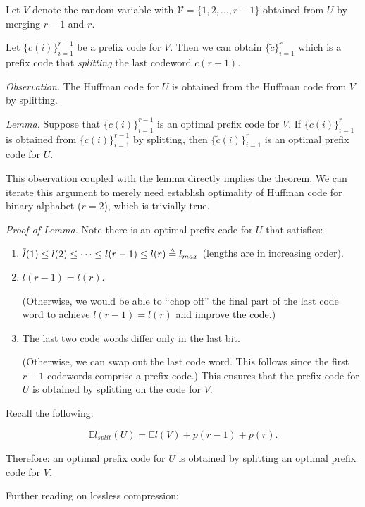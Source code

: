 \documentclass[12pt]{extarticle}
\newcommand{\EE}{\mathbb{E}}
\def\VV{\mathcal{V}}
\begin{document}
\def\VV{\mathcal{V}}

Let $V$ denote the random variable with $\VV = \{1, 2, \dots, r-1 \}$ obtained from $U$ by merging $r-1$ and $r$.

\def\ct{\tilde{c}}

Let $\{ c(i) \}_{i=1}^{r-1}$ be a prefix code for $V$.  Then we can obtain $\{\ct\}_{i=1}^{r}$ which is a prefix code that \textit{splitting} the last codeword $c(r-1)$.  

{\it Observation.} The Huffman code for $U$ is obtained from the Huffman code from $V$ by splitting.

{\it Lemma.} Suppose that $\{ c(i) \}_{i=1}^{r-1}$ is an optimal prefix code for $V$.  If $\{ \ct(i) \}_{i=1}^{r}$ is obtained from $\{ c(i) \}_{i=1}^{r-1}$ by splitting, then $\{ \ct(i) \}_{i=1}^{r}$ is an optimal prefix code for $U$.

This observation coupled with the lemma directly implies the theorem.  We can iterate this argument to merely need establish optimality of Huffman code for binary alphabet ($r=2$), which is trivially true.

\def\ep{\hfill \blacksquare}
\def\dq{\triangleq}
{\it Proof of Lemma.}  Note there is an optimal prefix code for $U$ that satisfies:

\def\lt{\tidle{l}}
\begin{enumerate}
  \item $\l(1) \leq l(2) \leq \dots \leq l(r-1) \leq l(r) \dq l_{max}$ (lengths are in increasing order).
  \item $l(r-1) = l(r)$.  
    
    (Otherwise, we would be able to ``chop off'' the final part of the last code word to achieve $l(r-1) = l(r)$ and improve the code.)
  \item The last two code words differ only in the last bit.
    
    (Otherwise, we can swap out the last code word.  This follows since the first $r-1$ codewords comprise a prefix code.)  This ensures that the prefix code for $U$ is obtained by splitting on the code for $V$. 
\end{enumerate}


Recall the following:

\[
  \EE l_{split} (U) = \EE l(V) + p(r-1) + p(r).
\]

Therefore: an optimal prefix code for $U$ is obtained by splitting an optimal prefix code for $V$. \ep

Further reading on lossless compression: 
\end{document}
